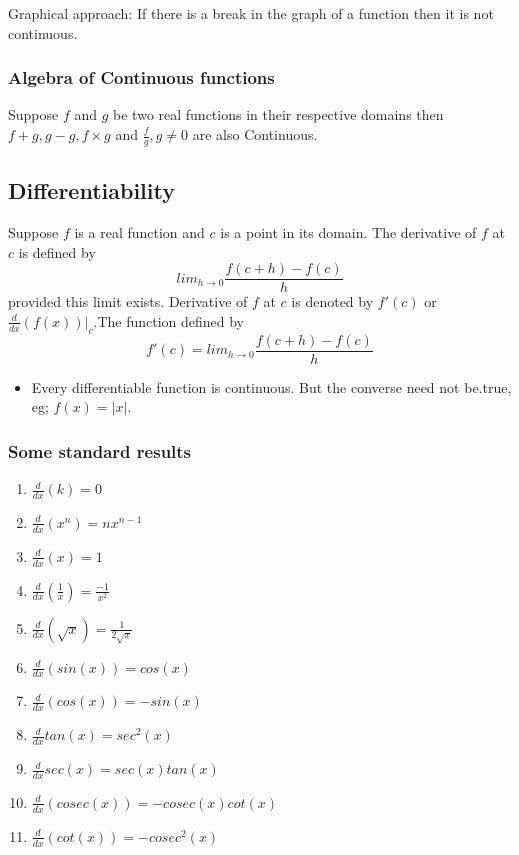 \documentclass[12pt]{article}
\begin{document}
\begin{multicols*}{2}
 Graphical approach: If there is a break in the graph of a function then it is not continuous.

 \subsubsection*{Algebra of Continuous functions}
 Suppose $f$ and $g$ be two real functions in their respective domains then  $f+g,g-g,f \times g$ and $\frac{f}{g},g \not =0$ are also Continuous.
 

 \subsection*{Differentiability}
 Suppose $f$ is a real function and $c$ is a point in its domain. The derivative of $f$ at $c$ is
defined by $$lim_{h \rightarrow 0} \frac{f(c+h)-f(c)}{h}$$
provided this limit exists. Derivative of $f$ at $c$ is denoted by $f'(c)$ or $\frac{d}{dx}(f(x))|_{c}$.The 
function defined by
$$f'(c)=lim_{h \rightarrow 0} \frac{f(c+h)-f(c)}{h}$$

\begin{itemize}
    \item Every differentiable function is continuous. But the converse need not be.true, eg; $f(x) = |x|$.
    
\end{itemize}

\subsubsection*{Some standard results}
\begin{enumerate}
    \item $\frac{d}{dx}(k)=0$
    \item $\frac{d}{dx}(x^n)=n x^{n-1}$
    \item $\frac{d}{dx}(x)=1$
    \item $\frac{d}{dx}(\frac{1}{x})=\frac{-1}{x^2}$
    \item $\frac{d}{dx}(\sqrt{x})=\frac{1}{2 \sqrt{x}}$
    \item $\frac{d}{dx}(sin (x))=cos(x)$
    \item $\frac{d}{dx}(cos(x))=-sin(x)$
    \item $\frac{d}{dx}{tan (x)}= sec^2(x)$
    \item $\frac{d}{dx}{sec(x)}= sec(x)tan(x)$
    \item $\frac{d}{dx}(cosec(x))=-cosec(x)cot(x)$
    \item $\frac{d}{dx}(cot(x))=-cosec^2(x)$
\end{enumerate}


\end{multicols*}
\end{document}
